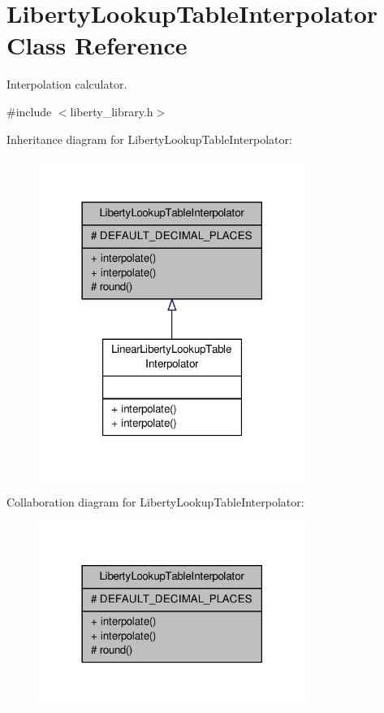 \hypertarget{classLibertyLookupTableInterpolator}{\section{Liberty\-Lookup\-Table\-Interpolator Class Reference}
\label{classLibertyLookupTableInterpolator}
}


Interpolation calculator.  




{\ttfamily \#include $<$liberty\-\_\-library.\-h$>$}



Inheritance diagram for Liberty\-Lookup\-Table\-Interpolator\-:\nopagebreak
\begin{figure}[H]
\begin{center}
\leavevmode
\includegraphics[width=246pt]{classLibertyLookupTableInterpolator__inherit__graph}
\end{center}
\end{figure}


Collaboration diagram for Liberty\-Lookup\-Table\-Interpolator\-:\nopagebreak
\begin{figure}[H]
\begin{center}
\leavevmode
\includegraphics[width=246pt]{classLibertyLookupTableInterpolator__coll__graph}
\end{center}
\end{figure}
